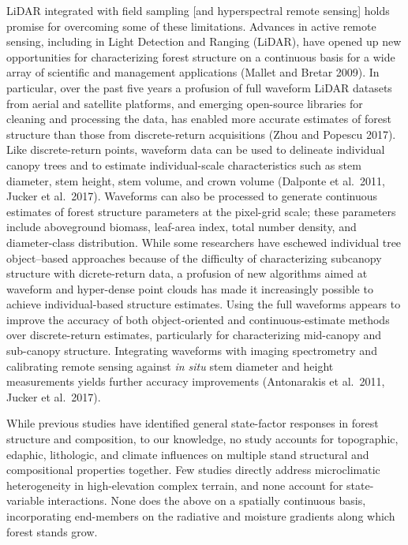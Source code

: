 \documentclass[
  12pt,
]{article}
\begin{document}
LiDAR integrated with field sampling {[}and hyperspectral remote
sensing{]} holds promise for overcoming some of these limitations.
Advances in active remote sensing, including in Light Detection and
Ranging (LiDAR), have opened up new opportunities for characterizing
forest structure on a continuous basis for a wide array of scientific
and management applications (Mallet and Bretar 2009). In particular,
over the past five years a profusion of full waveform LiDAR datasets
from aerial and satellite platforms, and emerging open-source libraries
for cleaning and processing the data, has enabled more accurate
estimates of forest structure than those from discrete-return
acquisitions (Zhou and Popescu 2017). Like discrete-return points,
waveform data can be used to delineate individual canopy trees and to
estimate individual-scale characteristics such as stem diameter, stem
height, stem volume, and crown volume (Dalponte et al.~2011, Jucker et
al.~2017). Waveforms can also be processed to generate continuous
estimates of forest structure parameters at the pixel-grid scale; these
parameters include aboveground biomass, leaf-area index, total number
density, and diameter-class distribution. While some researchers have
eschewed individual tree object--based approaches because of the
difficulty of characterizing subcanopy structure with dicrete-return
data, a profusion of new algorithms aimed at waveform and hyper-dense
point clouds has made it increasingly possible to achieve
individual-based structure estimates. Using the full waveforms appears
to improve the accuracy of both object-oriented and continuous-estimate
methods over discrete-return estimates, particularly for characterizing
mid-canopy and sub-canopy structure. Integrating waveforms with imaging
spectrometry and calibrating remote sensing against \emph{in situ} stem
diameter and height measurements yields further accuracy improvements
(Antonarakis et al.~2011, Jucker et al.~2017).

While previous studies have identified general state-factor responses in
forest structure and composition, to our knowledge, no study accounts
for topographic, edaphic, lithologic, and climate influences on multiple
stand structural and compositional properties together. Few studies
directly address microclimatic heterogeneity in high-elevation complex
terrain, and none account for state-variable interactions. None does the
above on a spatially continuous basis, incorporating end-members on the
radiative and moisture gradients along which forest stands grow.
\end{document}

